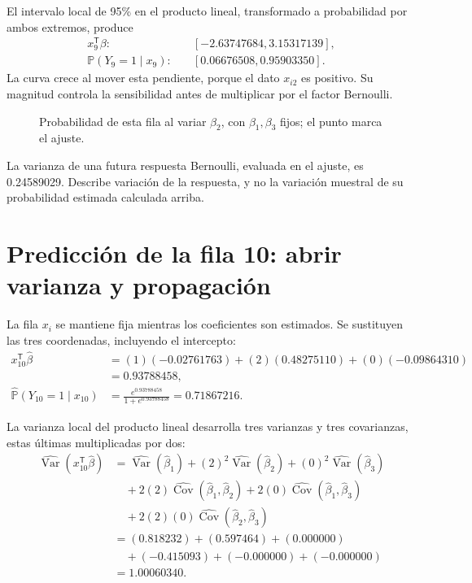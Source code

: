 \documentclass[11pt,a4paper]{article}
\newcommand{\Prob}{\mathbb P}
\newcommand{\T}{^{\mathsf T}}
\DeclareMathOperator{\Var}{Var}
\DeclareMathOperator{\Cov}{Cov}
\begin{document}
El intervalo local de 95\% en el producto lineal,
transformado a probabilidad por ambos extremos, produce
\[
\begin{aligned}
x_{9}\T\beta:&\quad[-2.63747684,3.15317139],\\\Prob(Y_{9}=1\mid x_{9}):&\quad[0.06676508,0.95903350].\end{aligned}
\]
La curva crece al mover esta pendiente, porque el dato $x_{i2}$ es positivo. Su magnitud controla la sensibilidad antes de multiplicar por el factor Bernoulli.
\begin{figure}[H]\centering
{}
\caption{Probabilidad de esta fila al variar \(\beta_2\), con \(\beta_1,\beta_3\) fijos; el punto marca el ajuste.}
\end{figure}

La varianza de una futura respuesta Bernoulli,
evaluada en el ajuste, es 0.24589029.
Describe variación de la respuesta, y no la variación
muestral de su probabilidad estimada calculada arriba.
\endgroup

\clearpage
\section{Predicción de la fila 10: abrir varianza y propagación}\label{logit119}
\begingroup\small
\setlength{\abovedisplayskip}{4pt}\setlength{\belowdisplayskip}{4pt}
La fila \(x_i\) se mantiene fija mientras los coeficientes
son estimados. Se sustituyen las tres coordenadas,
incluyendo el intercepto:
\[
\begin{aligned}
x_{10}\T\widehat\beta&=(1)(-0.02761763)+(2)(0.48275110)+(0)(-0.09864310)\\&=0.93788458,\\\widehat{\Prob}(Y_{10}=1\mid x_{10})&=\frac{e^{0.93788458}}{1+e^{0.93788458}}=0.71867216.\end{aligned}
\]

La varianza local del producto lineal desarrolla tres varianzas
y tres covarianzas, estas últimas multiplicadas por dos:
\[
\begin{aligned}
\widehat{\Var}(x_{10}\T\widehat\beta)&=\widehat{\Var}(\widehat\beta_1)+(2)^2\widehat{\Var}(\widehat\beta_2)+(0)^2\widehat{\Var}(\widehat\beta_3)\\&\quad+2(2)\widehat{\Cov}(\widehat\beta_1,\widehat\beta_2)+2(0)\widehat{\Cov}(\widehat\beta_1,\widehat\beta_3)\\&\quad+2(2)(0)\widehat{\Cov}(\widehat\beta_2,\widehat\beta_3)\\&=(0.818232)+(0.597464)+(0.000000)\\&\quad+(-0.415093)+(-0.000000)+(-0.000000)\\&=1.00060340.\end{aligned}
\]
\end{document}
